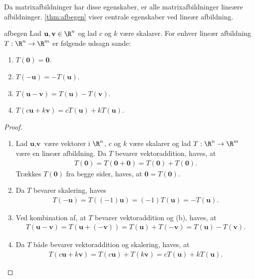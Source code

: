%
Da matrixafbildninger har disse egenskaber, er alle matrixafbildninger lineære afbildninger.
\ref{thm:afbegen} viser centrale egenskaber ved lineær afbildning.
\begin{thm}{}{afbegen}
Lad $\textbf{u}, \textbf{v} \in \R^n$ og lad $c$ og $k$ være skalarer.
For enhver lineær afbildning $T: \R^n \rightarrow \R^m$ er følgende udsagn sande:
\begin{enumerate}[label = (\alph*)]
\item $T(\textbf{0}) = \textbf{0}$.
\item $T(-\textbf{u}) = -T(\textbf{u})$.
\item $T(\textbf{u}-\textbf{v}) = T(\textbf{u})-T(\textbf{v})$.
\item $T(c\textbf{u} + k\textbf{v}) = cT(\textbf{u}) + kT(\textbf{u})$.
\end{enumerate}
\end{thm}
%
\begin{proof}
\begin{enumerate}[label=(\alph*)]
\item Lad $\textbf{u}, \textbf{v}$ være vektorer i $\R^n$, $c$ og $k$ være skalarer og lad $T: \R^n \rightarrow \R^m$ være en lineær afbildning.
Da $T$ bevarer vektoraddition, haves, at
%
\begin{align*}
T(\textbf{0}) = T(\textbf{0} + \textbf{0}) = T(\textbf{0}) + T(\textbf{0}).
\end{align*}
%
Trækkes $T(\textbf{0})$ fra begge sider, haves, at $\textbf{0} = T(\textbf{0})$.\\
%
\item Da $T$ bevarer skalering, haves
% 
\begin{align*}
T(-\textbf{u}) = T((-1)\textbf{u}) = (-1)T(\textbf{u}) = -T(\textbf{u}).
\end{align*}
%
\item Ved kombination af, at $T$ bevarer vektoraddition og (b), haves, at
%
\begin{align*}
T(\textbf{u}-\textbf{v}) = T(\textbf{u}+(-\textbf{v})) = T(\textbf{u})+T(-\textbf{v}) = T(\textbf{u}) - T(\textbf{v}).
\end{align*}
%
\item Da $T$ både bevarer vektoraddition og skalering, haves, at 
%
\begin{align*}
T(c\textbf{u} + k\textbf{v}) = T(c\textbf{u}) + T(k\textbf{v}) = cT(\textbf{u}) + kT(\textbf{u}).
\end{align*}
%
\end{enumerate}
\end{proof}
